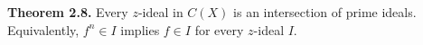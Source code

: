 \textbf{Theorem 2.8.} Every $z$-ideal in $C(X)$ is an intersection of prime ideals. Equivalently, $f^n \in I$ implies $f \in I$ for every $z$-ideal $I$.
